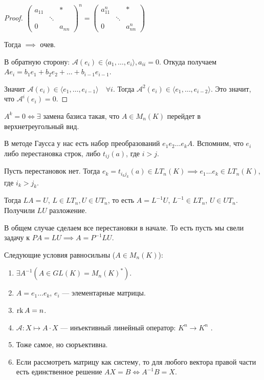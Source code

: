 \begin{proof}
    $\begin{pmatrix} a_{11} & & * \\ & \ddots & \\ 0 & & a_{nn} \end{pmatrix}^n = \begin{pmatrix} a_{11}^n & & * \\ & \ddots & \\ 0 & & a_{nn}^n \end{pmatrix}$

    Тогда $\implies$ очев.

    В обратную сторону:  $\mathcal{A}(e_i) \in \langle a_1, \ldots, e_i \rangle, a_{ii} = 0$. Откуда получаем $Ae_i = b_1e_1 + b_2e_2 + \ldots + b_{i-1}e_{i-1}$.

    Значит $\mathcal{A}(e_i) \in \langle e_1, \ldots, e_{i-1} \rangle \quad \forall i$.  Тогда $\mathcal{A}^2(e_i) \in \langle e_1,\ldots, e_{i-2} \rangle$. Это значит, что $\mathcal{A}^i(e_i) = 0$.
\end{proof}
\begin{remark}
    $A^k = 0 \iff \exists $ замена базиса  такая, что $A \in M_n(K)$ перейдет в верхнетреугольный вид.

\end{remark}
В методе Гаусса у нас есть набор преобразований $e_1e_2\ldots e_kA$. Вспомним, что $e_i$ либо перестановка строк, либо  $t_{ij}(a)$, где  $i > j$.

Пусть перестановок нет. Тогда  $e_k = t_{i_k j_k}(a) \in LT_n(K) \implies e_1 \ldots e_k \in LT_n(K)$, где $i_k > j_k$.

Тогда  $LA = U$,  $L \in LT_n, U \in UT_n$, то есть  $A = L^{-1}U$,  $L^{-1} \in LT_n$,  $U \in UT_n$. Получили  $LU$ разложение.

В общем случае сделаем все перестановки в начале. То есть пусть мы свели задачу к $PA = LU \implies A = P^{-1}LU$.
\begin{theorem}
    Следующие условия равносильны ($A \in M_n(K)$): 
    \begin{enumerate}
        \item $\exists A^{-1} (A \in GL(K) = M_n(K)^*)$.
        \item  $A = e_1 \ldots e_k$, $e_i$ --- элементарные матрицы. 
        \item $\operatorname{rk} A = n$.
        \item  $\mathcal{A}\!: X \mapsto A \cdot X$ --- инъективный линейный оператор: $K^n \to K^n$ .
        \item Тоже самое, но сюръективна.
        \item Если рассмотреть матрицу как систему, то для любого вектора правой части есть единственное решение  $AX = B \iff A^{-1}B = X$.
    \end{enumerate}
\end{theorem}
